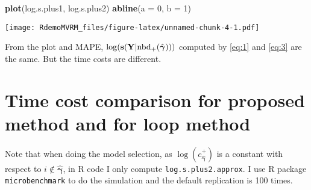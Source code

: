 \documentclass[
]{book}
\newenvironment{Shaded}{\begin{snugshade}}{\end{snugshade}}
\newcommand{\DataTypeTok}[1]{\textcolor[rgb]{0.13,0.29,0.53}{#1}}
\newcommand{\DecValTok}[1]{\textcolor[rgb]{0.00,0.00,0.81}{#1}}
\newcommand{\KeywordTok}[1]{\textcolor[rgb]{0.13,0.29,0.53}{\textbf{#1}}}
\newcommand{\NormalTok}[1]{#1}
\begin{document}
\begin{Shaded}
\begin{Highlighting}[]
\KeywordTok{plot}\NormalTok{(log.s.plus1, log.s.plus2)}
\KeywordTok{abline}\NormalTok{(}\DataTypeTok{a =} \DecValTok{0}\NormalTok{, }\DataTypeTok{b =} \DecValTok{1}\NormalTok{)}
\end{Highlighting}
\end{Shaded}

\texttt{[image: RdemoMVRM\_files/figure-latex/unnamed-chunk-4-1.pdf]}

From the plot and MAPE, \(\log({\bf s}({\bf Y}|{\text{nbd}}_+(\hat{\boldsymbol \gamma})))\) computed by \eqref{eq:1} and \eqref{eq:3} are the same. But the time costs are different.

\hypertarget{time-cost-comparison-for-proposed-method-and-for-loop-method}{%
\section{Time cost comparison for proposed method and for loop method}\label{time-cost-comparison-for-proposed-method-and-for-loop-method}}

Note that when doing the model selection, as \(\log(c_{\hat{\boldsymbol \gamma}}^+)\) is a constant with respect to \(i\notin \hat{\boldsymbol \gamma}\), in R code I only compute \texttt{log.s.plus2.approx}. I use R package \texttt{microbenchmark} to do the simulation and the default replication is 100 times.
\end{document}
